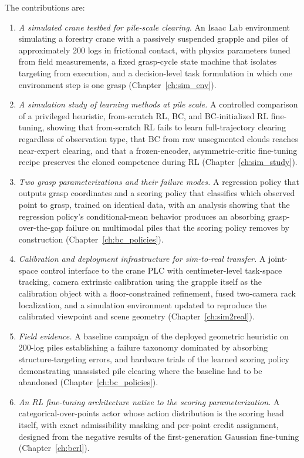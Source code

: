 The contributions are:
\begin{enumerate}
\item \emph{A simulated crane testbed for pile-scale clearing.} An Isaac Lab
environment simulating a forestry crane with a passively suspended grapple and
piles of approximately 200 logs in frictional contact, with physics parameters tuned
from field measurements, a fixed grasp-cycle state machine that isolates
targeting from execution, and a decision-level task formulation in which one
environment step is one grasp (Chapter~\ref{ch:sim_env}).
\item \emph{A simulation study of learning methods at pile scale.} A
controlled comparison of a privileged heuristic, from-scratch RL, BC, and
BC-initialized RL fine-tuning, showing that from-scratch RL fails to learn
full-trajectory clearing regardless of observation type, that BC from raw
unsegmented clouds reaches near-expert clearing, and that a frozen-encoder,
asymmetric-critic fine-tuning recipe preserves the cloned competence during RL
(Chapter~\ref{ch:sim_study}).
\item \emph{Two grasp parameterizations and their failure modes.} A regression
policy that outputs grasp coordinates and a scoring policy that classifies
which observed point to grasp, trained on identical data, with an analysis
showing that the regression policy's conditional-mean behavior produces an
absorbing grasp-over-the-gap failure on multimodal piles that the scoring
policy removes by construction (Chapter~\ref{ch:bc_policies}).
\item \emph{Calibration and deployment infrastructure for sim-to-real
transfer.} A joint-space control interface to the crane PLC with
centimeter-level task-space tracking, camera extrinsic calibration using the
grapple itself as the calibration object with a floor-constrained refinement,
fused two-camera rack localization, and a simulation environment updated to
reproduce the calibrated viewpoint and scene geometry
(Chapter~\ref{ch:sim2real}).
\item \emph{Field evidence.} A baseline campaign of the deployed geometric
heuristic on 200-log piles establishing a failure taxonomy dominated by
absorbing structure-targeting errors, and hardware trials of the learned
scoring policy demonstrating unassisted pile clearing where the baseline had
to be abandoned (Chapter~\ref{ch:bc_policies}).
\item \emph{An RL fine-tuning architecture native to the scoring
parameterization.} A categorical-over-points actor whose action distribution
is the scoring head itself, with exact admissibility masking and per-point
credit assignment, designed from the negative results of the first-generation
Gaussian fine-tuning (Chapter~\ref{ch:bcrl}).
\end{enumerate}

